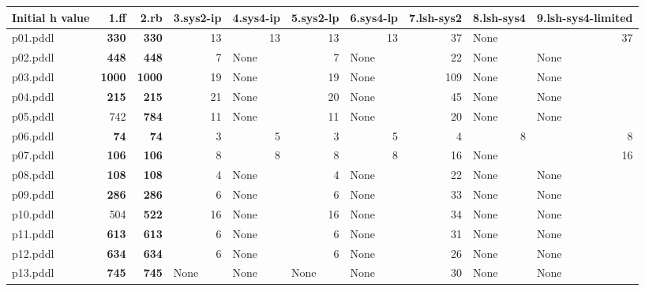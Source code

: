 \documentclass{article}
\begin{document}
\begin{tabular}{@{}lrrrrrrrrr@{}}
Initial h value & 1.ff & 2.rb & 3.sys2-ip & 4.sys4-ip & 5.sys2-lp & 6.sys4-lp & 7.lsh-sys2 & 8.lsh-sys4 & 9.lsh-sys4-limited \\
\midrule
p01.pddl & \textbf{330} & \textbf{330} & 13 & 13 & 13 & 13 & 37 & \multicolumn{1}{|l|}{None} & 37 \\
p02.pddl & \textbf{448} & \textbf{448} & 7 & \multicolumn{1}{|l|}{None} & 7 & \multicolumn{1}{|l|}{None} & 22 & \multicolumn{1}{|l|}{None} & \multicolumn{1}{|l|}{None} \\
p03.pddl & \textbf{1000} & \textbf{1000} & 19 & \multicolumn{1}{|l|}{None} & 19 & \multicolumn{1}{|l|}{None} & 109 & \multicolumn{1}{|l|}{None} & \multicolumn{1}{|l|}{None} \\
p04.pddl & \textbf{215} & \textbf{215} & 21 & \multicolumn{1}{|l|}{None} & 20 & \multicolumn{1}{|l|}{None} & 45 & \multicolumn{1}{|l|}{None} & \multicolumn{1}{|l|}{None} \\
p05.pddl & 742 & \textbf{784} & 11 & \multicolumn{1}{|l|}{None} & 11 & \multicolumn{1}{|l|}{None} & 20 & \multicolumn{1}{|l|}{None} & \multicolumn{1}{|l|}{None} \\
p06.pddl & \textbf{74} & \textbf{74} & 3 & 5 & 3 & 5 & 4 & 8 & 8 \\
p07.pddl & \textbf{106} & \textbf{106} & 8 & 8 & 8 & 8 & 16 & \multicolumn{1}{|l|}{None} & 16 \\
p08.pddl & \textbf{108} & \textbf{108} & 4 & \multicolumn{1}{|l|}{None} & 4 & \multicolumn{1}{|l|}{None} & 22 & \multicolumn{1}{|l|}{None} & \multicolumn{1}{|l|}{None} \\
p09.pddl & \textbf{286} & \textbf{286} & 6 & \multicolumn{1}{|l|}{None} & 6 & \multicolumn{1}{|l|}{None} & 33 & \multicolumn{1}{|l|}{None} & \multicolumn{1}{|l|}{None} \\
p10.pddl & 504 & \textbf{522} & 16 & \multicolumn{1}{|l|}{None} & 16 & \multicolumn{1}{|l|}{None} & 34 & \multicolumn{1}{|l|}{None} & \multicolumn{1}{|l|}{None} \\
p11.pddl & \textbf{613} & \textbf{613} & 6 & \multicolumn{1}{|l|}{None} & 6 & \multicolumn{1}{|l|}{None} & 31 & \multicolumn{1}{|l|}{None} & \multicolumn{1}{|l|}{None} \\
p12.pddl & \textbf{634} & \textbf{634} & 6 & \multicolumn{1}{|l|}{None} & 6 & \multicolumn{1}{|l|}{None} & 26 & \multicolumn{1}{|l|}{None} & \multicolumn{1}{|l|}{None} \\
p13.pddl & \textbf{745} & \textbf{745} & \multicolumn{1}{|l|}{None} & \multicolumn{1}{|l|}{None} & \multicolumn{1}{|l|}{None} & \multicolumn{1}{|l|}{None} & 30 & \multicolumn{1}{|l|}{None} & \multicolumn{1}{|l|}{None} \\

\end{tabular}
\end{document}
